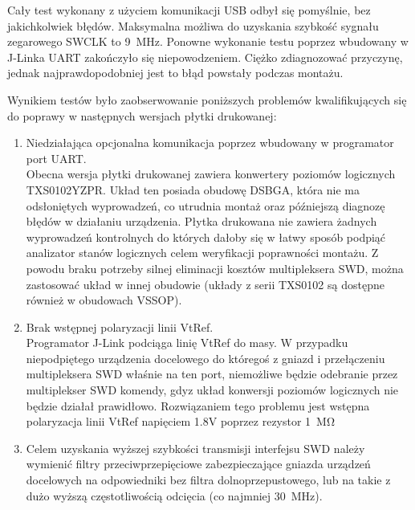Cały test wykonany z użyciem komunikacji USB odbył się pomyślnie, bez jakichkolwiek błędów. Maksymalna możliwa do uzyskania szybkość sygnału zegarowego SWCLK to \SI{9}{MHz}.
Ponowne wykonanie testu poprzez wbudowany w J-Linka UART zakończyło się niepowodzeniem. Ciężko zdiagnozować przyczynę, jednak najprawdopodobniej jest to błąd powstały podczas montażu.

Wynikiem testów było zaobserwowanie poniższych problemów kwalifikujących się do poprawy w następnych wersjach płytki drukowanej:
\begin{enumerate}
    \item Niedziałająca opcjonalna komunikacja poprzez wbudowany w programator port UART. \\
    Obecna wersja płytki drukowanej zawiera konwertery poziomów logicznych TXS0102YZPR. Układ ten posiada obudowę DSBGA, która nie ma odsłoniętych wyprowadzeń, co utrudnia montaż oraz późniejszą diagnozę błędów w działaniu urządzenia. Płytka drukowana nie zawiera żadnych wyprowadzeń kontrolnych do których dałoby się w łatwy sposób podpiąć analizator stanów logicznych celem weryfikacji poprawności montażu. Z powodu braku potrzeby silnej eliminacji kosztów multipleksera SWD, można zastosować układ w innej obudowie (układy z serii TXS0102 są dostępne również w obudowach VSSOP).
    \item Brak wstępnej polaryzacji linii VtRef.\\
    Programator J-Link podciąga linię VtRef do masy. W przypadku niepodpiętego urządzenia docelowego do któregoś z gniazd i przełączeniu multipleksera SWD właśnie na ten port, niemożliwe będzie odebranie przez multiplekser SWD komendy, gdyz układ konwersji poziomów logicznych nie będzie działał prawidłowo. Rozwiązaniem tego problemu jest wstępna polaryzacja linii VtRef napięciem 1.8V poprzez rezystor \SI{1}{\Mohm}
    \item Celem uzyskania wyższej szybkości transmisji interfejsu SWD należy wymienić filtry przeciwprzepięciowe zabezpieczające gniazda urządzeń docelowych na odpowiedniki bez filtra dolnoprzepustowego, lub na takie z dużo wyższą częstotliwością odcięcia (co najmniej \SI{30}{MHz}).
    
\end{enumerate}
